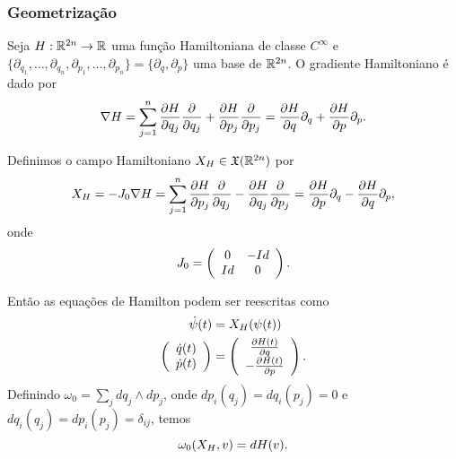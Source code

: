 \documentclass{beamer}
\begin{document}
	\begin{frame}
		\frametitle{Geometrização}
		
		Seja $H:\mathbb{R}^{2n} \to \mathbb{R}^{}$ uma função Hamiltoniana de classe $C^{\infty}$ e $\{\partial_{q_{1}}, \dots, \partial_{q_{n}}, \partial_{p_{1}}, \dots, \partial_{p_{n}}\}=\{\partial_{q}, \partial_{p}\}$ uma base de $\mathbb{R}^{2n}$. O gradiente Hamiltoniano é dado por
		$$
		\nabla H =\sum_{j=1}^{n}\frac{\partial H}{\partial q_{j}}\frac{\partial }{\partial q_{j}} + \frac{\partial H}{\partial p_{j}}\frac{\partial }{\partial p_{j}} = \frac{\partial H}{\partial q}\partial_{q} + \frac{\partial H}{\partial p}\partial_{p}.
		$$
		
		Definimos o campo Hamiltoniano $X_{H} \in \mathfrak{X}(\mathbb{R}^{2n})$ por 
		$$
		X_{H} = -J_{0} \nabla H = \sum_{j=1}^{n}\frac{\partial H}{\partial p_{j}}\frac{\partial }{\partial q_{j}} - \frac{\partial H}{\partial q_{j}}\frac{\partial }{\partial p_{j}} = \frac{\partial H}{\partial p}\partial_{q} - \frac{\partial H}{\partial q}\partial_{p}, 
		$$
		onde
		$$
		J_{0}=
		\left(
		\begin{array}{cc}
		0 & -Id
		\\
		Id & 0
		\end{array}
		\right). 
		$$
	\end{frame}
	
	\begin{frame}
		Então as equações de Hamilton podem ser reescritas como 
		$$
		\begin{aligned}
		\dot{\psi}(t) &= X_{H}(\psi(t))
		\\
		\left(
		\begin{array}{c}
		\dot{q}(t)
		\\
		\dot{p}(t)
		\end{array}
		\right)
		&=
		\left(
		\begin{array}{c}
		\frac{\partial H(t)}{\partial q}
		\\
		-\frac{\partial H(t)}{\partial p}
		\end{array}
		\right).
		\end{aligned}
		$$
		Definindo $\omega_{0}= \sum_{j}  dq_{j}\wedge dp_{j}$, onde $dp_{i}(q_{j}) = dq_{i}(p_{j}) = 0$ e $dq_{i}(q_{j}) = dp_{i}(p_{j}) = \delta_{ij}$, temos
		$$
		\omega_{0}(X_{H}, v) = dH(v).
		$$
		
	\end{frame}
	
\end{document}
